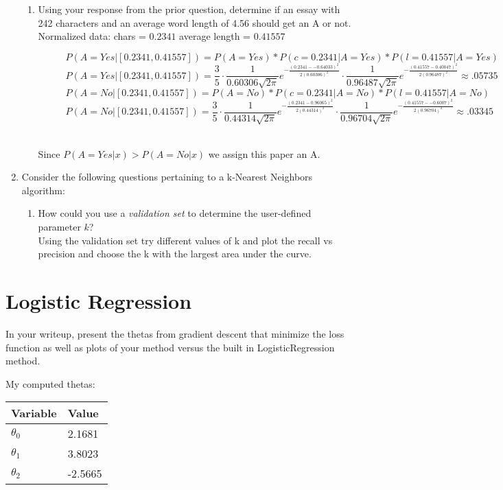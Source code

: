 \documentclass[12pt]{article}
\begin{document}
\begin{enumerate}
\begin{enumerate}
	\item Using your response from the prior question, determine if an essay with 242 characters and an average word length of 4.56 should get an A or not.\\
    Normalized data: chars = $0.2341$ average length = $0.41557$
    \begin{figure}[h!]
    $$P(A=Yes | [0.2341,0.41557]) = P(A=Yes)*P(c=0.2341|A=Yes)*P(l=0.41557|A=Yes)$$
    $$P(A=Yes | [0.2341,0.41557]) = \frac{3}{5}\cdot\frac{1}{0.60306\sqrt{2\pi}}e^{-\frac{(0.2341 - -0.64033)^2}{2(0.60306)^2}}\cdot\frac{1}{0.96487\sqrt{2\pi}}e^{-\frac{(0.41557 - 0.40047)^2}{2(0.96487)^2}} \approx .05735$$
    $$P(A=No | [0.2341,0.41557]) = P(A=No)*P(c=0.2341|A=No)*P(l=0.41557|A=No)$$
    $$P(A=No | [0.2341,0.41557]) = \frac{3}{5}\cdot\frac{1}{0.44314\sqrt{2\pi}}e^{-\frac{(0.2341 - 0.96065)^2}{2(0.44314)^2}}\cdot\frac{1}{0.96704\sqrt{2\pi}}e^{-\frac{(0.41557 - -0.6007)^2}{2(0.96704)^2}} \approx .03345$$
    \end{figure}\\
    Since $P(A=Yes | x) > P(A=No | x)$ we assign this paper an A.
	\end{enumerate}
\item Consider the following questions pertaining to a k-Nearest Neighbors algorithm:
	\begin{enumerate}
	\item How could you use a \emph{validation set} to determine the user-defined parameter $k$?\\
    Using the validation set try different values of k and plot the recall vs precision and choose the k with the largest area under the curve.
	\end{enumerate}
\end{enumerate}


\newpage
\section{Logistic Regression}\label{naive}
In your writeup, present the thetas from gradient descent that minimize the loss function as well as plots of your method versus the built in LogisticRegression method.

My computed thetas:
\begin{tabular}{|l|l|}
\hline
Variable   & Value  \\
\hline
$\theta_0$ & 2.1681 \\
$\theta_1$ & 3.8023 \\
$\theta_2$ &-2.5665 \\
\hline
\end{tabular}
\end{document}
